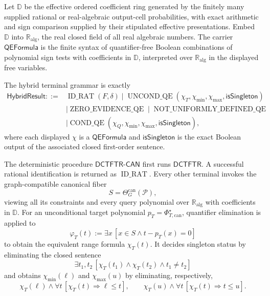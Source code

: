 Let \(\mathbb D\) be the effective ordered coefficient ring generated by the finitely many supplied rational or real-algebraic output-cell probabilities, with exact arithmetic and sign comparison supplied by their stipulated effective presentations.  Embed \(\mathbb D\) into \(\mathbb R_{\mathrm{alg}}\), the real closed field of all real algebraic numbers.  The carrier \(\mathsf{QEFormula}\) is the finite syntax of quantifier-free Boolean combinations of polynomial sign tests with coefficients in \(\mathbb D\), interpreted over \(\mathbb R_{\mathrm{alg}}\) in the displayed free variables.

The hybrid terminal grammar is exactly
\[
\begin{split}
\mathsf{HybridResult}::={}&
\operatorname{ID\_RAT}(F,\delta)
\mid\operatorname{UNCOND\_QE}(\chi_T,\chi_{\min},\chi_{\max},\mathsf{isSingleton})\\
&\mid\operatorname{ZERO\_EVIDENCE\_QE}
\mid\operatorname{NOT\_UNIFORMLY\_DEFINED\_QE}\\
&\mid\operatorname{COND\_QE}(\chi_Q,\chi_{\min},\chi_{\max},\mathsf{isSingleton}),
\end{split}
\tag{1}
\]
where each displayed \(\chi\) is a \(\mathsf{QEFormula}\) and \(\mathsf{isSingleton}\) is the exact Boolean output of the associated closed first-order sentence.

The deterministic procedure \(\mathsf{DCTFTR\text{-}CAN}\) first runs \(\mathsf{DCTFTR}\).  A successful rational identification is returned as \(\operatorname{ID\_RAT}\).  Every other terminal invokes the graph-compatible canonical fiber
\[
S=\Theta_G^{\mathrm{can}}(\mathcal P),
\]
viewing all its constraints and every query polynomial over \(\mathbb R_{\mathrm{alg}}\) with coefficients in \(\mathbb D\).  For an unconditional target polynomial \(p_T=\Phi_{T,\mathrm{can}}^\star\), quantifier elimination is applied to
\[
\varphi_T(t):=\exists x\,[x\in S\wedge t-p_T(x)=0]
\tag{2}
\]
to obtain the equivalent range formula \(\chi_T(t)\).  It decides singleton status by eliminating the closed sentence
\[
\exists t_1,t_2\,[\chi_T(t_1)\wedge\chi_T(t_2)\wedge t_1\ne t_2]
\tag{3}
\]
and obtains \(\chi_{\min}(\ell)\) and \(\chi_{\max}(u)\) by eliminating, respectively,
\[
\chi_T(\ell)\wedge\forall t\,[\chi_T(t)\Longrightarrow\ell\leq t],
\qquad
\chi_T(u)\wedge\forall t\,[\chi_T(t)\Longrightarrow t\leq u].
\tag{4}
\]


